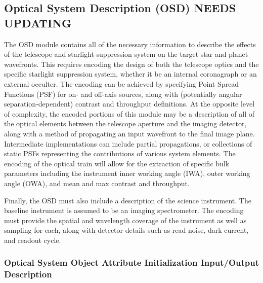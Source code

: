 \documentclass[cleanfoot]{asme2ej}
\begin{document}
\subsection{Optical System Description (OSD) NEEDS UPDATING}
The OSD module contains all of the necessary information to describe the effects of the telescope and starlight suppression system on the target star and planet wavefronts.  This requires encoding the design of both the telescope optics and the specific starlight suppression system, whether it be an internal coronagraph or an external occulter.  The encoding can be achieved by specifying Point Spread Functions (PSF) for on- and off-axis sources, along with (potentially angular separation-dependent) contrast and throughput definitions.  At the opposite level of complexity, the encoded portions of this module may be a description of all of the optical elements between the telescope aperture and the imaging detector, along with a method of propagating an input wavefront to the final image plane.  Intermediate implementations can include partial propagations, or collections of static PSFs representing the contributions of various system elements.  The encoding of the optical train will allow for the extraction of specific bulk parameters including the instrument inner working angle (IWA), outer working angle (OWA), and mean and max contrast and throughput.

Finally, the OSD must also include a description of the science instrument.  The baseline instrument is assumed to be an imaging spectrometer.  The encoding must provide the spatial and wavelength coverage of the instrument as well as sampling for each, along with detector details such as read noise, dark current, and readout cycle.
\label{sec:opticalsystem}
\subsubsection{Optical System Object Attribute Initialization Input/Output Description} 
\end{document}
